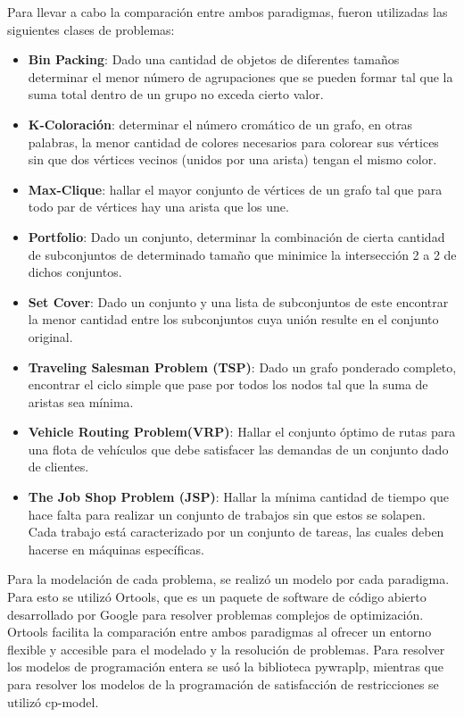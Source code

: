 \documentclass[12pt]{report}
\begin{document}
Para llevar a cabo la comparación entre ambos paradigmas, fueron utilizadas las siguientes clases de problemas:
\begin{itemize}
\item \textbf{Bin Packing}: Dado una cantidad de objetos de diferentes tamaños determinar el menor número de agrupaciones que se pueden formar tal que la suma total dentro de un grupo no exceda cierto valor.
\item \textbf{K-Coloración}: determinar el número cromático de un grafo, en otras palabras, la menor cantidad de colores necesarios para colorear sus vértices sin que dos vértices vecinos (unidos por una arista) tengan el mismo color.
\item \textbf{Max-Clique}: hallar el mayor conjunto de vértices de un grafo tal que para todo par de vértices hay una arista que los une.
\item \textbf{Portfolio}: Dado un conjunto, determinar la combinación de cierta cantidad de subconjuntos de determinado tamaño que minimice la intersección 2 a 2 de dichos conjuntos.
\item \textbf{Set Cover}: Dado un conjunto y una lista de subconjuntos de este encontrar la menor cantidad entre los subconjuntos cuya unión resulte en el conjunto original.
\item \textbf{Traveling Salesman Problem (TSP)}: Dado un grafo ponderado completo, encontrar el ciclo simple que pase por todos los nodos tal que la suma de aristas sea mínima.
\item \textbf{Vehicle Routing Problem(VRP)}:  Hallar el conjunto óptimo de rutas para una flota de vehículos que debe satisfacer las demandas de un conjunto dado de clientes.
\item \textbf{The Job Shop Problem (JSP)}: Hallar la mínima cantidad de tiempo que hace falta para realizar un conjunto de trabajos sin que estos se solapen. Cada trabajo está caracterizado por un conjunto de tareas, las cuales deben hacerse en máquinas específicas.\\

\end{itemize}

Para la modelación de cada problema, se realizó un modelo por cada paradigma. Para esto se utilizó Ortools, que es un paquete de software de código abierto desarrollado por Google para resolver problemas complejos de optimización. Ortools facilita la comparación entre ambos paradigmas al ofrecer un entorno flexible y accesible para el modelado y la resolución de problemas. Para resolver los modelos de programación entera se usó la biblioteca pywraplp, mientras que para resolver los modelos de la programación de satisfacción de  restricciones se utilizó cp-model.\\
\end{document}
